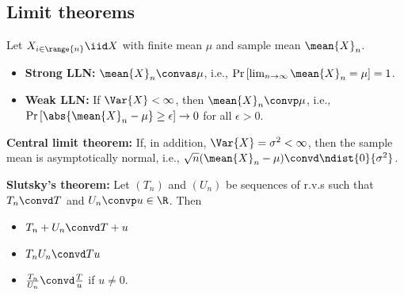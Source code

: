\documentclass[a4paper]{article}
\begin{document}
    \subsection{Limit theorems}
        Let $X_{i \in \range{n}} \iid X$ with finite mean $\mu$ and sample mean $\mean{X}_n$.
        \begin{itemize}
            \item \textbf{Strong LLN:} $\mean{X}_n \convas \mu$, i.e., $\Pr{\left[\lim_{n \rightarrow \infty} \mean{X}_n = \mu \right]} = 1$.
            \item \textbf{Weak LLN:} If $\Var{X} < \infty$, then $\mean{X}_n \convp \mu$, i.e., $\Pr{[\abs{\mean{X}_n - \mu} \geq \epsilon]} \rightarrow 0$ for all $\epsilon > 0$.
        \end{itemize}

        \textbf{Central limit theorem:} If, in addition, $\Var{X} = \sigma^2 < \infty$, then the sample mean is asymptotically normal, i.e., $\sqrt{n} (\mean{X}_n - \mu) \convd \ndist{0}{\sigma^2}$.

        \textbf{Slutsky's theorem: } Let $(T_n)$ and $(U_n)$ be sequences of r.v.s such that $T_n \convd T$ and $U_n \convp u \in \R$.
        Then
        \begin{itemize}
            \item $T_n + U_n \convd T + u$
            \item $T_n U_n \convd Tu$
            \item $\frac{T_n}{U_n} \convd \frac{T}{u}$ if $u \neq 0$.
        \end{itemize}
\end{document}

